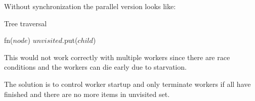 Without synchronization the parallel version looks like:

\begin{algorithm}[H]
    \caption{Tree traversal}
\begin{algorithmic}[1]

        
        \Spawn
                \State fn($node$)
                        \State $unvisited$.put($child$)
                    \EndIf
                \EndFor
            \EndWhile
        \EndSpawn

    \EndFunction
\end{algorithmic}
\end{algorithm}

This would not work correctly with multiple workers since there are race conditions and the workers can die early due to starvation.

The solution is to control worker startup and only terminate workers if all have finished and there are no more items in unvisited set.

